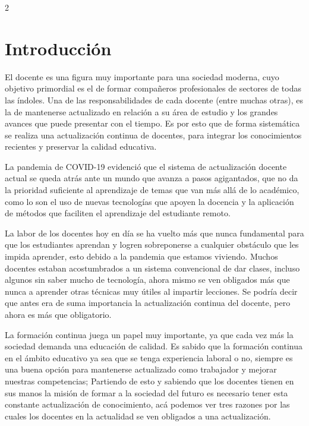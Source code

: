 \documentclass[12pt,spanish,Letterpaper,openany]{book}
\begin{document}
\begin {multicols}{2}

\hypertarget{introducciuxf3n-4}{%
\section{Introducción}\label{introducciuxf3n-4}}

El docente es una figura muy importante para una sociedad moderna, cuyo objetivo primordial es el de formar compañeros profesionales de sectores de todas las índoles. Una de las responsabilidades de cada docente (entre muchas otras), es la de mantenerse actualizado en relación a su área de estudio y los grandes avances que puede presentar con el tiempo. Es por esto que de forma sistemática se realiza una actualización continua de docentes, para integrar los conocimientos recientes y preservar la calidad educativa.

La pandemia de COVID-19 evidenció que el sistema de actualización docente actual se queda atrás ante un mundo que avanza a pasos agigantados, que no da la prioridad suficiente al aprendizaje de temas que van más allá de lo académico, como lo son el uso de nuevas tecnologías que apoyen la docencia y la aplicación de métodos que faciliten el aprendizaje del estudiante remoto.

La labor de los docentes hoy en día se ha vuelto más que nunca fundamental para que los estudiantes aprendan y logren sobreponerse a cualquier obstáculo que les impida aprender, esto debido a la pandemia que estamos viviendo. Muchos docentes estaban acostumbrados a un sistema convencional de dar clases, incluso algunos sin saber mucho de tecnología, ahora mismo se ven obligados más que nunca a aprender otras técnicas muy útiles al impartir lecciones. Se podría decir que antes era de suma importancia la actualización continua del docente, pero ahora es más que obligatorio.

La formación continua juega un papel muy importante, ya que cada vez más la sociedad demanda una educación de calidad. Es sabido que la formación continua en el ámbito educativo ya sea que se tenga experiencia laboral o no, siempre es una buena opción para mantenerse actualizado como trabajador y mejorar nuestras competencias; Partiendo de esto y sabiendo que los docentes tienen en sus manos la misión de formar a la sociedad del futuro es necesario tener esta constante actualización de conocimiento, acá podemos ver tres razones por las cuales los docentes en la actualidad se ven obligados a una actualización.


\end{multicols}
\end{document}

